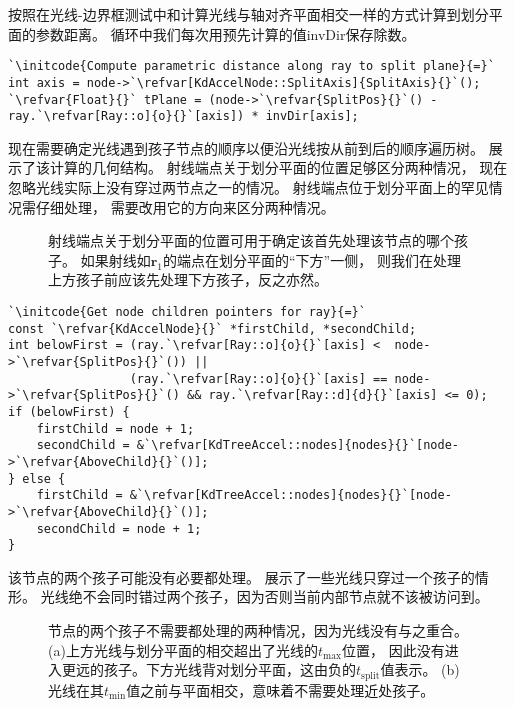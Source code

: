 按照在光线-边界框测试中和计算光线与轴对齐平面相交一样的方式计算到划分平面的参数距离。
循环中我们每次用预先计算的值{\ttfamily invDir}保存除数。
\begin{lstlisting}
`\initcode{Compute parametric distance along ray to split plane}{=}`
int axis = node->`\refvar[KdAccelNode::SplitAxis]{SplitAxis}{}`();
`\refvar{Float}{}` tPlane = (node->`\refvar{SplitPos}{}`() - ray.`\refvar[Ray::o]{o}{}`[axis]) * invDir[axis];
\end{lstlisting}

现在需要确定光线遇到孩子节点的顺序以便沿光线按从前到后的顺序遍历树。
展示了该计算的几何结构。
射线端点关于划分平面的位置足够区分两种情况，
现在忽略光线实际上没有穿过两节点之一的情况。
射线端点位于划分平面上的罕见情况需仔细处理，
需要改用它的方向来区分两种情况。
\begin{figure}[htbp]
    \centering
    \caption{射线端点关于划分平面的位置可用于确定该首先处理该节点的哪个孩子。
    如果射线如$\bm r_1$的端点在划分平面的“下方”一侧，
    则我们在处理上方孩子前应该先处理下方孩子，反之亦然。}
    \label{fig:4.18}
\end{figure}
\begin{lstlisting}
`\initcode{Get node children pointers for ray}{=}`
const `\refvar{KdAccelNode}{}` *firstChild, *secondChild;
int belowFirst = (ray.`\refvar[Ray::o]{o}{}`[axis] <  node->`\refvar{SplitPos}{}`()) ||
                 (ray.`\refvar[Ray::o]{o}{}`[axis] == node->`\refvar{SplitPos}{}`() && ray.`\refvar[Ray::d]{d}{}`[axis] <= 0);
if (belowFirst) {
    firstChild = node + 1;
    secondChild = &`\refvar[KdTreeAccel::nodes]{nodes}{}`[node->`\refvar{AboveChild}{}`()];
} else {
    firstChild = &`\refvar[KdTreeAccel::nodes]{nodes}{}`[node->`\refvar{AboveChild}{}`()];
    secondChild = node + 1;
}
\end{lstlisting}

该节点的两个孩子可能没有必要都处理。
展示了一些光线只穿过一个孩子的情形。
光线绝不会同时错过两个孩子，因为否则当前内部节点就不该被访问到。
\begin{figure}[htbp]
    \centering
    \caption{节点的两个孩子不需要都处理的两种情况，因为光线没有与之重合。
    (a)上方光线与划分平面的相交超出了光线的$t_{\max}$位置，
    因此没有进入更远的孩子。下方光线背对划分平面，这由负的$t_{\text{split}}$值表示。
    (b)光线在其$t_{\min}$值之前与平面相交，意味着不需要处理近处孩子。}
    \label{fig:4.19}
\end{figure}

